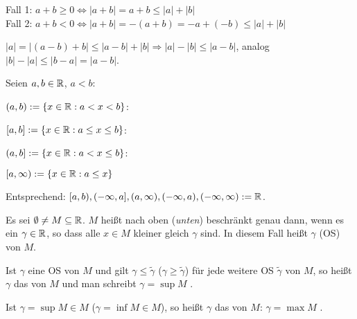 \documentclass[a4paper,twoside,DIV15,BCOR12mm]{scrbook}
\begin{document}
\begin{beweise}
\setcounter{enumi}{4}
\item Fall 1: $a+b \ge 0 \Leftrightarrow |a+b| = a+b \le |a| + |b|$ \\
Fall 2: $a+b  <  0 \Leftrightarrow |a+b| = -(a+b) = - a + (-b) \le |a| + |b|$ \\
\item $|a| = |(a-b) + b| \le |a-b| + |b| \Rightarrow |a| - |b| \le |a-b|$, analog $|b|-|a| \le |b-a| = |a-b|$.
\end{beweise}

\begin{definition}[Intervall]
Seien $a,b \in \mathbb{R}$, $a<b$:

\begin{liste}
\item $(a,b) := \{ x \in \mathbb{R}: a < x < b\} $: 
\item $[a,b] := \{ x \in \mathbb{R}: a \le x \le b\} $: 
\item $(a,b] := \{ x \in \mathbb{R}: a < x \le b\} $: 
\item $[a, \infty) := \{ x \in \mathbb{R}: a \le x \}$
\end{liste}

Entsprechend: $[a,b), (-\infty, a], (a, \infty), (-\infty, a), (-\infty, \infty) := \mathbb{R}$.
\end{definition}

\begin{definition}

Es sei $\emptyset \ne M \subseteq \mathbb{R}$. $M$ heißt nach oben (\textit{unten}) beschränkt genau dann, wenn es ein $\gamma \in \mathbb{R}$, so dass alle $x \in M$ kleiner gleich  $\gamma$ sind. In diesem Fall heißt $\gamma$  (OS)  von $M$.

Ist $\gamma$ eine OS  von $M$ und gilt $\gamma \le \tilde\gamma$ ($\gamma \ge \tilde\gamma$) für jede weitere OS  $\tilde\gamma$ von $M$, so heißt $\gamma$ das   von $M$ und man schreibt $\gamma = \sup{M}$ .

Ist $\gamma = \sup{M} \in M$ ($\gamma = \inf{M} \in M$), so heißt $\gamma$ das   von $M$: $\gamma = \max{M}$ .
\end{definition}
\end{document}
